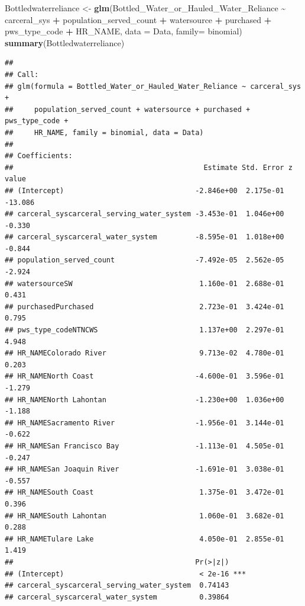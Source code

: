 \documentclass[
]{article}
\newenvironment{Shaded}{\begin{snugshade}}{\end{snugshade}}
\newcommand{\AttributeTok}[1]{\textcolor[rgb]{0.13,0.29,0.53}{#1}}
\newcommand{\FunctionTok}[1]{\textcolor[rgb]{0.13,0.29,0.53}{\textbf{#1}}}
\newcommand{\NormalTok}[1]{#1}
\newcommand{\OtherTok}[1]{\textcolor[rgb]{0.56,0.35,0.01}{#1}}
\newcommand{\SpecialCharTok}[1]{\textcolor[rgb]{0.81,0.36,0.00}{\textbf{#1}}}
\begin{document}
\begin{Shaded}
\begin{Highlighting}[]
\NormalTok{Bottledwaterreliance }\OtherTok{\textless{}{-}} \FunctionTok{glm}\NormalTok{(Bottled\_Water\_or\_Hauled\_Water\_Reliance }\SpecialCharTok{\textasciitilde{}}\NormalTok{ carceral\_sys }\SpecialCharTok{+}\NormalTok{ population\_served\_count }\SpecialCharTok{+}\NormalTok{ watersource }\SpecialCharTok{+}\NormalTok{ purchased }\SpecialCharTok{+}\NormalTok{ pws\_type\_code }\SpecialCharTok{+}\NormalTok{ HR\_NAME, }\AttributeTok{data =}\NormalTok{ Data, }\AttributeTok{family=}\NormalTok{ binomial)}
\FunctionTok{summary}\NormalTok{(Bottledwaterreliance)}
\end{Highlighting}
\end{Shaded}

\begin{verbatim}
## 
## Call:
## glm(formula = Bottled_Water_or_Hauled_Water_Reliance ~ carceral_sys + 
##     population_served_count + watersource + purchased + pws_type_code + 
##     HR_NAME, family = binomial, data = Data)
## 
## Coefficients:
##                                             Estimate Std. Error z value
## (Intercept)                               -2.846e+00  2.175e-01 -13.086
## carceral_syscarceral_serving_water_system -3.453e-01  1.046e+00  -0.330
## carceral_syscarceral_water_system         -8.595e-01  1.018e+00  -0.844
## population_served_count                   -7.492e-05  2.562e-05  -2.924
## watersourceSW                              1.160e-01  2.688e-01   0.431
## purchasedPurchased                         2.723e-01  3.424e-01   0.795
## pws_type_codeNTNCWS                        1.137e+00  2.297e-01   4.948
## HR_NAMEColorado River                      9.713e-02  4.780e-01   0.203
## HR_NAMENorth Coast                        -4.600e-01  3.596e-01  -1.279
## HR_NAMENorth Lahontan                     -1.230e+00  1.036e+00  -1.188
## HR_NAMESacramento River                   -1.956e-01  3.144e-01  -0.622
## HR_NAMESan Francisco Bay                  -1.113e-01  4.505e-01  -0.247
## HR_NAMESan Joaquin River                  -1.691e-01  3.038e-01  -0.557
## HR_NAMESouth Coast                         1.375e-01  3.472e-01   0.396
## HR_NAMESouth Lahontan                      1.060e-01  3.682e-01   0.288
## HR_NAMETulare Lake                         4.050e-01  2.855e-01   1.419
##                                           Pr(>|z|)    
## (Intercept)                                < 2e-16 ***
## carceral_syscarceral_serving_water_system  0.74143    
## carceral_syscarceral_water_system          0.39864    

\end{verbatim}
\end{document}
